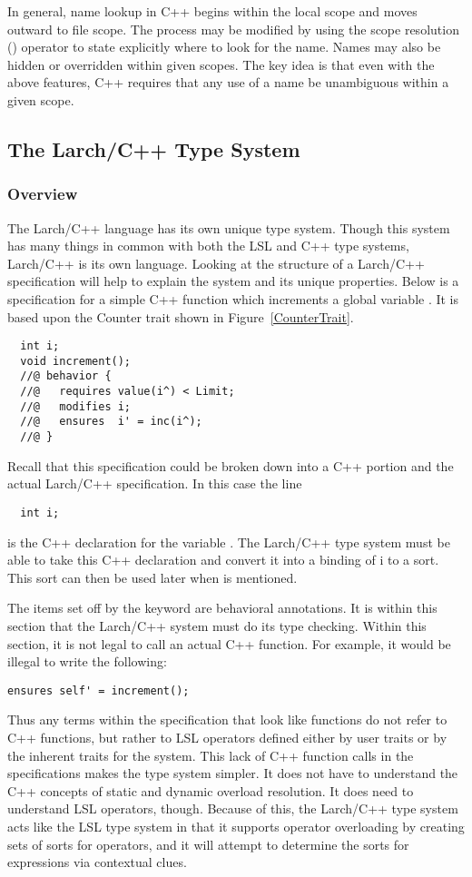In general, name lookup in C++ begins within the local scope and moves
outward to file scope. The process may be modified by using the scope
resolution (\reserved{::}) operator to state explicitly where to look for the
name. Names may also be hidden or overridden within given scopes. The
key idea is that even with the above features, C++ requires that any
use of a name be unambiguous within a given scope.

\subsection{The Larch/C++ Type System}
\label{lcppts}
\subsubsection{Overview}
The Larch/C++ language has its own unique type system. Though this
system has many things in common with both the LSL and C++ type
systems, Larch/C++ is its own language. Looking at the structure of a
Larch/C++ specification will help to explain the system and its
unique properties. Below is a specification for a simple C++ function
 which increments a global variable
. It is based upon the Counter trait shown in Figure~\ref{CounterTrait}.

\begin{verbatim}
  int i;
  void increment();
  //@ behavior {
  //@   requires value(i^) < Limit;
  //@   modifies i;
  //@   ensures  i' = inc(i^);
  //@ }
\end{verbatim}

\noindent Recall that this specification could be broken down into a
C++ portion and the actual Larch/C++ specification. In this case the line
\begin{verbatim}
  int i;
\end{verbatim}
is the C++ declaration for the variable . The
Larch/C++ type system must be able to take this C++ declaration and
convert it into a binding of i to a sort. This sort can then be used later
when  is mentioned. 

The items set off by the  keyword are behavioral annotations. It is within this section that the
Larch/C++ system must do its type checking. Within this section, it is
not legal to call an actual C++ function. For example, it would be
illegal to write the following:
\begin{verbatim}
ensures self' = increment();
\end{verbatim}
Thus any terms within the specification that look like functions do not
refer to C++ functions, but rather to LSL operators defined either by
user traits or by the inherent traits for the system. This lack of C++
function calls in the specifications makes the type system simpler. It
does not have to understand the C++ concepts of static and dynamic
overload resolution. It does need to understand LSL operators,
though. Because of this, the Larch/C++ type system acts like the LSL
type system in that it supports operator overloading by creating sets
of sorts for operators, and it will attempt to determine the sorts for
expressions via contextual clues.

